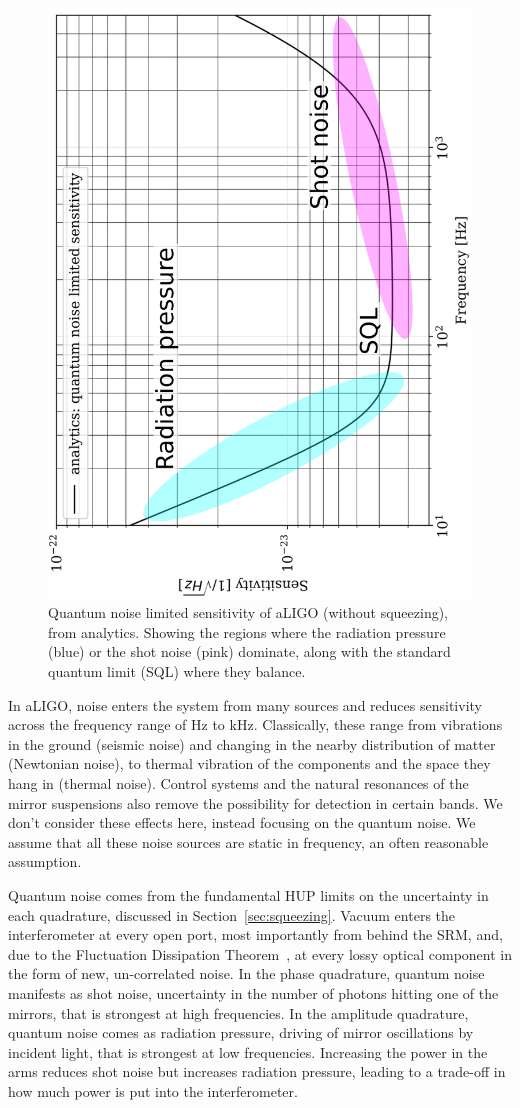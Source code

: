 \documentclass[aps,pra,superscriptaddress,reprint,nofootinbib]{revtex4-1}
\begin{document}
\begin{figure}
	\begin{center}
	\includegraphics[height=0.6\textwidth, angle=-90]{figures/sqz_aLIGO_analytics_quantum_noise_budget-labelled.pdf}
	\end{center}
	\caption{Quantum noise limited sensitivity of aLIGO (without squeezing), from analytics. Showing the regions where the radiation pressure (blue) or the shot noise (pink) dominate, along with the standard quantum limit (SQL) where they balance.}
	\label{fig:sqz_aLIGO_analytics_quantum_noise_budget}
\end{figure}


In aLIGO, noise enters the system from many sources and reduces sensitivity across the frequency range of Hz to kHz. Classically, these range from vibrations in the ground (seismic noise) and changing in the nearby distribution of matter (Newtonian noise), to thermal vibration of the components and the space they hang in (thermal noise). Control systems and the natural resonances of the mirror suspensions also remove the possibility for detection in certain bands. We don’t consider these effects here, instead focusing on the quantum noise. We assume that all these noise sources are static in frequency, an often reasonable assumption. 


Quantum noise comes from the fundamental HUP limits on the uncertainty in each quadrature, discussed in Section~\ref{sec:squeezing}. Vacuum enters the interferometer at every open port, most importantly from behind the SRM, and, due to the Fluctuation Dissipation Theorem~\cite{Danilishin_2012}, at every lossy optical component in the form of new, un-correlated noise. In the phase quadrature, quantum noise manifests as shot noise, uncertainty in the number of photons hitting one of the mirrors, that is strongest at high frequencies. In the amplitude quadrature, quantum noise comes as radiation pressure, driving of mirror oscillations by incident light, that is strongest at low frequencies. Increasing the power in the arms reduces shot noise but increases radiation pressure, leading to a trade-off in how much power is put into the interferometer.
\end{document}
